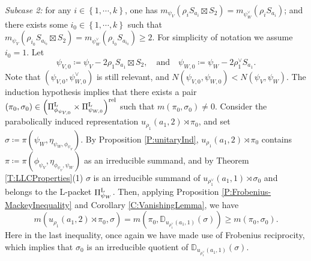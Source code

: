 \documentclass[11pt,letterpaper]{amsart}
\theoremstyle{plain}
\numberwithin{theorem}{section}
\numberwithin{equation}{subsection}
\theoremstyle{remark}
\newcommand{\D}{\mathbb{D}}
\def\LP{\Pi^{\rm L}} %
\def\rel{{\rm rel}} %
\begin{document}
\emph{Subcase 2:} for any $i\in\left\{1,\cdots,k\right\}$, one has $m_{\psi_V}\left(\rho_{i} S_{a_{i}}\boxtimes S_2\right) = m_{\psi_W^\vee}\left(\rho_{i} S_{a_{i}}\right)$; and there exists some $i_0\in\left\{1,\cdots,k\right\}$ such that $m_{\psi_V}\left(\rho_{i_0} S_{a_{i_0}}\boxtimes S_2\right) = m_{\psi_W^\vee}\left(\rho_{i_0} S_{a_{i_0}}\right) \geq 2$. For simplicity of notation we assume $i_0=1$. Let
\[
    \psi_{V,0} \coloneqq \psi_V - 2\rho_1 S_{a_1}\boxtimes S_2, \quad \text{and} \quad \psi_{W,0} \coloneqq \psi_W-2\rho_1^\vee S_{a_1}.
\]
Note that $\left(\psi_{V,0},\psi_{W,0}^\vee\right)$ is still relevant, and $N\left(\psi_{V,0},\psi_{W,0}\right)<N\left(\psi_V,\psi_W\right)$. The induction hypothesis implies that there exists a pair $\left(\pi_0,\sigma_0\right)\in\left(\LP_{\phi_{\psi_{V,0}}}\times\LP_{\psi_{W,0}}\right)^\rel$ such that $m\left(\pi_0,\sigma_0\right)\neq 0$. Consider the parabolically induced representation $u_{\rho_1}\left(a_1,2\right)\rtimes \pi_0$, and set $\sigma\coloneqq\pi\left(\psi_W,\eta_{\psi_W,\phi_{\psi_V}}\right)$. By Proposition \ref{P:unitaryInd}, $u_{\rho_1}\left(a_1,2\right)\rtimes \pi_0$ contains $\pi\coloneqq \pi\left(\phi_{\psi_V},\eta_{\phi_{\psi_V},\psi_W}\right)$ as an irreducible summand, and by Theorem \ref{T:LLCProperties}(1) $\sigma$ is an irreducible summand of $u_{\rho_1^\vee}\left(a_1,1\right)\rtimes\sigma_0$ and belongs to the L-packet $\LP_{\psi_W}$. Then, applying Proposition \ref{P:Frobenius-MackeyInequality} and Corollary \ref{C:VanishingLemma}, we have
\[
    m\left(u_{\rho_1}\left(a_1,2\right)\rtimes \pi_0,\sigma\right) = m\left(\pi_0, \D_{u_{\rho_1^\vee}\left(a_1,1\right)}\left(\sigma\right)\right)\geq m\left(\pi_0,\sigma_0\right).
\]
Here in the last inequality, once again we have made use of Frobenius reciprocity, which implies that $\sigma_0$ is an irreducible quotient of $\D_{u_{\rho_1^\vee}\left(a_1,1\right)}\left(\sigma\right)$. 

\vskip 5pt
\end{document}
